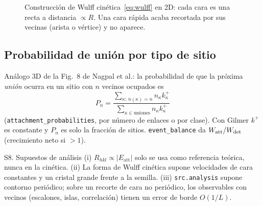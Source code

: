 \documentclass[11pt,a4paper]{article}
\newcommand{\code}[1]{\texttt{#1}}
\newcommand{\Eatt}{E_{\mathrm{att}}}
\begin{document}
\begin{figure}[t]
\centering
{}
\caption{Construcción de Wulff cinética~\eqref{eq:wulff} en 2D: cada cara es una recta a distancia
$\propto R$. Una cara rápida acaba recortada por sus vecinas (arista o vértice) y no aparece.}
\label{fig:wulff}
\end{figure}

\subsection{Probabilidad de unión por tipo de sitio}

Análogo 3D de la Fig.~8 de Nagpal et al.: la probabilidad de que la próxima \emph{unión} ocurra en un
sitio con $n$ vecinos ocupados es
\begin{equation}
P_n=\frac{\sum_{\kappa:\,n(\kappa)=n}n_\kappa k^+_\kappa}{\sum_{\kappa\in\text{uniones}}n_\kappa k^+_\kappa}
\label{eq:Pn}
\end{equation}
(\code{attachment\_probabilities}, por número de enlaces o por clase). Con Gilmer $k^+$ es constante y
$P_n$ es solo la fracción de sitios. \code{event\_balance} da $W_{\rm att}/W_{\rm det}$ (crecimiento
neto si $>1$).

\begin{supuesto}{S8. Supuestos de análisis}
(i) $R_{hkl}\propto|\Eatt|$ solo se usa como referencia teórica, nunca en la cinética. (ii) La forma
de Wulff cinética supone velocidades de cara constantes y un cristal grande frente a la semilla.
(iii) \code{src.analysis} supone contorno periódico; sobre un recorte de cara no periódico, los
observables con vecinos (escalones, islas, correlación) tienen un error de borde $O(1/L)$.
\end{supuesto}
\end{document}
